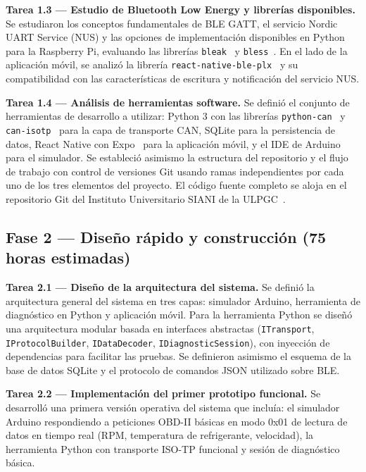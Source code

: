 \textbf{Tarea 1.3 — Estudio de Bluetooth Low Energy y librerías disponibles.} Se estudiaron los conceptos fundamentales de BLE GATT, el servicio Nordic UART Service (NUS) y las opciones de implementación disponibles en Python para la Raspberry Pi, evaluando las librerías \texttt{bleak}~\cite{Bleak_lib} y \texttt{bless}~\cite{Bless_lib}. En el lado de la aplicación móvil, se analizó la librería \texttt{react-native-ble-plx}~\cite{ReactNativeBLEPLX} y su compatibilidad con las características de escritura y notificación del servicio NUS.

\textbf{Tarea 1.4 — Análisis de herramientas software.} Se definió el conjunto de herramientas de desarrollo a utilizar: Python 3 con las librerías \texttt{python-can}~\cite{Twiss23-pythoncan} y \texttt{can-isotp}~\cite{Menager23-isotp} para la capa de transporte CAN, SQLite para la persistencia de datos, React Native con Expo~\cite{Expo_docs} para la aplicación móvil, y el IDE de Arduino~\cite{Arduino_IDE} para el simulador. Se estableció asimismo la estructura del repositorio y el flujo de trabajo con control de versiones Git usando ramas independientes por cada uno de los tres elementos del proyecto. El código fuente completo se aloja en el repositorio Git del Instituto Universitario SIANI de la ULPGC~\cite{SIANI_Git}.

\subsection{Fase 2 — Diseño rápido y construcción \textnormal{(75 horas estimadas)}}

\textbf{Tarea 2.1 — Diseño de la arquitectura del sistema.} Se definió la arquitectura general del sistema en tres capas: simulador Arduino, herramienta de diagnóstico en Python y aplicación móvil. Para la herramienta Python se diseñó una arquitectura modular basada en interfaces abstractas (\texttt{ITransport}, \texttt{IProtocolBuilder}, \texttt{IDataDecoder}, \texttt{IDiagnosticSession}), con inyección de dependencias para facilitar las pruebas. Se definieron asimismo el esquema de la base de datos SQLite y el protocolo de comandos JSON utilizado sobre BLE.

\textbf{Tarea 2.2 — Implementación del primer prototipo funcional.} Se desarrolló una primera versión operativa del sistema que incluía: el simulador Arduino respondiendo a peticiones OBD-II básicas en modo 0x01 de lectura de datos en tiempo real (RPM, temperatura de refrigerante, velocidad), la herramienta Python con transporte ISO-TP funcional y sesión de diagnóstico básica.

